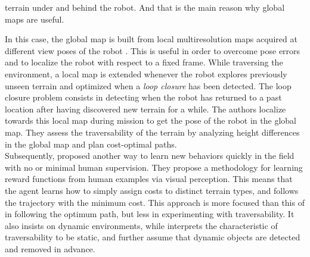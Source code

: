 \documentclass[12pt,a4paper,table,dvipsnames,tikz]{report}
\newcommand{\term}{\textit}
\begin{document}
	terrain under and behind the robot. And that is the main reason why global maps 
	are useful. 
	\par
	In this case, the global map is built from local multiresolution maps acquired at 
	different view poses of the robot \citep{Droeschel}. This is useful in order to 
	overcome pose errors and to localize the robot with respect to a fixed frame. 
	While traversing the environment, a local map is extended whenever the robot 
	explores previously unseen terrain and optimized when a \term{loop closure} has 
	been detected. The loop closure problem consists in detecting when the robot has 
	returned to a past location after having discovered new terrain for a while. The 
	authors localize towards this local map during mission to get the pose of the 
	robot in the global map. They assess the traversability of the terrain by 
	analyzing height differences in the global map and plan cost-optimal paths.
	\\
	
	Subsequently, \citet{Wigness} proposed another way to learn new behaviors quickly 
	in the field with no or minimal human supervision. They propose a methodology for 
	learning reward functions from human examples via visual perception. This means 
	that the agent learns how to simply assign costs to distinct terrain types, and 
	follows the trajectory with the minimum cost. This approach is more focused than 
	this of \citet{Suger} in following the optimum path, but less in experimenting 
	with traversability. It also insists on dynamic environments, while \citet{Suger} 
	interprets the characteristic of traversability to be static, and further assume 
	that dynamic objects are detected and removed in advance.
	\\
	
\end{document}
